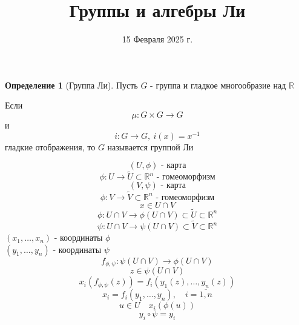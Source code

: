 \documentclass[a4paper]{article}
\theoremstyle{definition}
\newtheorem*{definition}{Определение}
\begin{document}
\title{Группы и алгебры Ли}
\author{}
\date{15 Февраля 2025 г.}
\maketitle

\begin{tcolorbox}[title=Группы Ли]
    \begin{definition}[Группа Ли]
    Пусть $ G $ - группа и гладкое многообразие над $ \mathbb{R} $ 

    Если 
    \[
        \mu: G \times G \to G
    \]
    и
    \[
        i: G \to G, \ i(x) = x^{-1}
    \]
    гладкие отображения, то $ G $ называется группой Ли
\end{definition}
\end{tcolorbox}

\[
    (U, \phi) \text{ - карта}
\]
\[
    \phi: U \to \widetilde{U} \subset \mathbb{R}^{n} \text{ - гомеоморфизм}
\]
\[
    (V, \psi) \text{ - карта}
\]
\[
    \phi: V \to \widetilde{V} \subset \mathbb{R}^{n} \text{ - гомеоморфизм}
\]
\[
    x \in U \cap V
\]
\[
    \phi: U \cap V \to \phi(U \cap V) \subset \widetilde{U} \subset \mathbb{R}^{n}
\]
\[
    \psi: U \cap V \to \psi(U \cap V) \subset \widetilde{V} \subset \mathbb{R}^{n}
\]
$ (x_1, \dots, x_n) $ - координаты $ \phi $ \\
$ (y_1, \dots, y_n) $ - координаты $ \psi $
\[
    f_{\phi, \psi}: \psi(U \cap V) \to \phi(U \cap V)
\]
\[
    z \in \psi(U \cap V)
\]
\[
    x_i(f_{\phi, \psi}(z)) = f_i(y_1(z), \dots, y_n(z))
\]
\[
    x_i = f_i(y_1, \dots, y_n), \quad i = \overline{1,n}
\]
\[
    u \in U \quad x_i(\phi(u))
\]
\[
    y_i \circ \psi = y_i
\]
\end{document}
